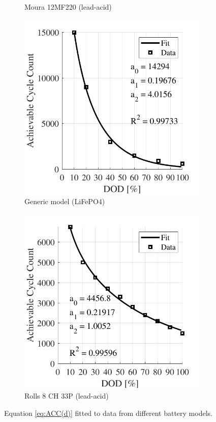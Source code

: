 \documentclass{ieeeaccess}
\begin{document}
\begin{figure}[!h]
\begin{subfigure}{.235\textwidth}
            \caption{Moura 12MF220 (lead-acid)}
            \label{fig:accMoura}
        \end{subfigure}

        \begin{subfigure}{.235\textwidth}
            \centering
            \includegraphics[width=.8\linewidth]{figures/acc_fitting_Unknown_model_LiPO4.pdf}
            \caption{Generic model (LiFePO4) \cite{BATUNI2020}}
            \label{fig:accLipeo4}
        \end{subfigure}
        \begin{subfigure}{.235\textwidth}
            \centering
            \includegraphics[width=.8\linewidth]{figures/acc_fitting_Rolls_16CH35P_lead-acid.pdf}
            \caption{Rolls 8 CH 33P (lead-acid)}
            \label{fig:accNimh}
        \end{subfigure}
        \caption{Equation \eqref{eq:ACC(d)} fitted to data from different battery models.}
        \label{fig:acc(d)}
    \end{figure}
\end{document}
